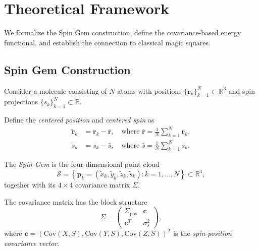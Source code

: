 \section{Theoretical Framework}
\label{sec:theory}

We formalize the Spin Gem construction, define the covariance-based energy functional, and establish the connection to classical magic squares.

\subsection{Spin Gem Construction}
\label{sec:construction}

Consider a molecule consisting of $N$ atoms with positions $\{\mathbf{r}_k\}_{k=1}^N \subset \mathbb{R}^3$ and spin projections $\{s_k\}_{k=1}^N \subset \mathbb{R}$.

\begin{definition}
\label{def:centered}
Define the \emph{centered position} and \emph{centered spin} as
\begin{align}
\tilde{\mathbf{r}}_k &= \mathbf{r}_k - \bar{\mathbf{r}}, \quad \text{where } \bar{\mathbf{r}} = \frac{1}{N} \sum_{k=1}^N \mathbf{r}_k, \\
\tilde{s}_k &= s_k - \bar{s}, \quad \text{where } \bar{s} = \frac{1}{N} \sum_{k=1}^N s_k.
\end{align}
\end{definition}

\begin{definition}
\label{def:spin_gem}
The \emph{Spin Gem} is the four-dimensional point cloud
\begin{equation}
\mathcal{S} = \left\{ \mathbf{p}_k = (\tilde{x}_k, \tilde{y}_k, \tilde{z}_k, \tilde{s}_k) : k = 1, \ldots, N \right\} \subset \mathbb{R}^4,
\end{equation}
together with its $4 \times 4$ covariance matrix $\Sigma$.
\end{definition}

The covariance matrix has the block structure
\begin{equation}
\Sigma = \begin{pmatrix}
\Sigma_{\text{pos}} & \mathbf{c} \\
\mathbf{c}^T & \sigma_s^2
\end{pmatrix},
\end{equation}
where $\mathbf{c} = (\text{Cov}(X, S), \text{Cov}(Y, S), \text{Cov}(Z, S))^T$ is the \emph{spin-position covariance vector}.

